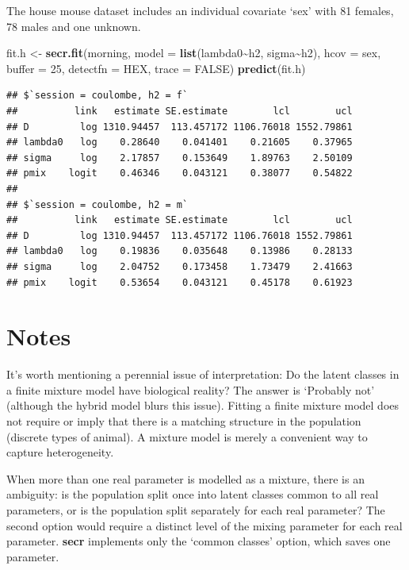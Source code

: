 \documentclass[
]{book}
\newenvironment{Shaded}{\begin{snugshade}}{\end{snugshade}}
\newcommand{\AttributeTok}[1]{\textcolor[rgb]{0.13,0.29,0.53}{#1}}
\newcommand{\ConstantTok}[1]{\textcolor[rgb]{0.56,0.35,0.01}{#1}}
\newcommand{\DecValTok}[1]{\textcolor[rgb]{0.00,0.00,0.81}{#1}}
\newcommand{\FunctionTok}[1]{\textcolor[rgb]{0.13,0.29,0.53}{\textbf{#1}}}
\newcommand{\NormalTok}[1]{#1}
\newcommand{\OtherTok}[1]{\textcolor[rgb]{0.56,0.35,0.01}{#1}}
\newcommand{\SpecialCharTok}[1]{\textcolor[rgb]{0.81,0.36,0.00}{\textbf{#1}}}
\newcommand{\StringTok}[1]{\textcolor[rgb]{0.31,0.60,0.02}{#1}}
\begin{document}
The house mouse dataset includes an individual covariate `sex' with 81 females, 78 males and one unknown.

\begin{Shaded}
\begin{Highlighting}[]
\NormalTok{fit.h }\OtherTok{\textless{}{-}} \FunctionTok{secr.fit}\NormalTok{(morning, }\AttributeTok{model =} \FunctionTok{list}\NormalTok{(lambda0}\SpecialCharTok{\textasciitilde{}}\NormalTok{h2, sigma}\SpecialCharTok{\textasciitilde{}}\NormalTok{h2), }
    \AttributeTok{hcov =} \StringTok{\textquotesingle{}sex\textquotesingle{}}\NormalTok{, }\AttributeTok{buffer =} \DecValTok{25}\NormalTok{, }\AttributeTok{detectfn =} \StringTok{\textquotesingle{}HEX\textquotesingle{}}\NormalTok{, }\AttributeTok{trace =} \ConstantTok{FALSE}\NormalTok{)}
\FunctionTok{predict}\NormalTok{(fit.h)}
\end{Highlighting}
\end{Shaded}

\begin{verbatim}
## $`session = coulombe, h2 = f`
##          link   estimate SE.estimate        lcl        ucl
## D         log 1310.94457  113.457172 1106.76018 1552.79861
## lambda0   log    0.28640    0.041401    0.21605    0.37965
## sigma     log    2.17857    0.153649    1.89763    2.50109
## pmix    logit    0.46346    0.043121    0.38077    0.54822
## 
## $`session = coulombe, h2 = m`
##          link   estimate SE.estimate        lcl        ucl
## D         log 1310.94457  113.457172 1106.76018 1552.79861
## lambda0   log    0.19836    0.035648    0.13986    0.28133
## sigma     log    2.04752    0.173458    1.73479    2.41663
## pmix    logit    0.53654    0.043121    0.45178    0.61923
\end{verbatim}

\section{Notes}\label{notes}

It's worth mentioning a perennial issue of interpretation: Do the latent classes in a finite mixture model have biological reality? The answer is `Probably not' (although the hybrid model blurs this issue). Fitting a finite mixture model does not require or imply that there is a matching structure in the population (discrete types of animal). A mixture model is merely a convenient way to capture heterogeneity.

When more than one real parameter is modelled as a mixture, there is an ambiguity: is the population split once into latent classes common to all real parameters, or is the population split separately for each real parameter? The second option would require a distinct level of the mixing parameter for each real parameter. \textbf{secr} implements only the `common classes' option, which saves one parameter.
\end{document}
